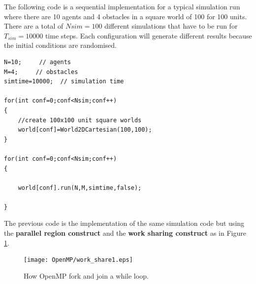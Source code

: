 The following code is a sequential implementation for a typical simulation
run where there are 10 agents and 4 obstacles in a square world of 100 for
100 units.
There are a total of $Nsim=100$ different simulations that have to be run for
$T_{sim}=10000$ time steps.
Each configuration will generate different results because the initial conditions
are randomised.
\begin{lstlisting}
N=10;     // agents
M=4;     // obstacles
simtime=10000;  // simulation time

for(int conf=0;conf<Nsim;conf++)
{
    //create 100x100 unit square worlds
    world[conf]=World2DCartesian(100,100);
}

for(int conf=0;conf<Nsim;conf++)
{

    world[conf].run(N,M,simtime,false);

}
\end{lstlisting}

The previous code is the implementation of the same simulation code
but using the \textbf{parallel region construct} and the
\textbf{work sharing construct} as in Figure \ref{Fig:Parallel:fork}.

\begin{figure}[htbp]
\begin{center}
\texttt{[image: OpenMP/work\_share1.eps]}
\end{center}
\small{
\caption[OpenMP fork loop]{
How OpenMP fork and join a while loop.
\label{Fig:Parallel:fork}}}
\end{figure}

